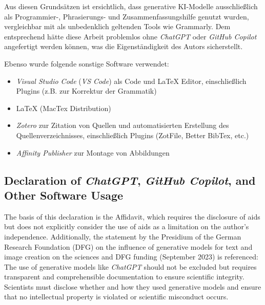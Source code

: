 Aus diesen Grundsätzen ist ersichtlich, dass generative KI-Modelle
ausschließlich als Programmier-, Phrasierungs- und Zusammenfassungshilfe genutzt
wurden, vergleichbar mit als unbedenklich geltenden Tools wie Grammarly. Dem
entsprechend hätte diese Arbeit problemlos ohne \textit{ChatGPT} oder \textit{GitHub Copilot}
angefertigt werden können, was die Eigenständigkeit des Autors sicherstellt.

\noindent Ebenso wurde folgende sonstige Software verwendet:
\begin{itemize}
    \item \textit{Visual Studio Code} (\textit{VS Code}) als Code und LaTeX
          Editor, einschließlich Plugins (z.B. zur Korrektur der Grammatik)
    \item LaTeX (MacTex Distribution)
    \item \textit{Zotero} zur Zitation von Quellen und automatisierten Erstellung des
          Quellenverzeichnisses, einschließlich Plugins (ZotFile, Better BibTex, etc.)
    \item \textit{Affinity Publisher} zur Montage von Abbildungen
\end{itemize}




\newpage



\subsection*{Declaration of \textit{ChatGPT}, \textit{GitHub Copilot}, and Other Software Usage}

The basis of this declaration is the Affidavit, which requires the disclosure of
aids but does not explicitly consider the use of aids as a limitation on the
author’s independence. Additionally, the statement by the Presidium of the
German Research Foundation (DFG) on the influence of generative models for text
and image creation on the sciences and DFG funding (September 2023) is
referenced: The use of generative models like \textit{ChatGPT} should not be
excluded but requires transparent and comprehensible documentation to ensure
scientific integrity. Scientists must disclose whether and how they used
generative models and ensure that no intellectual property is violated or
scientific misconduct occurs.

